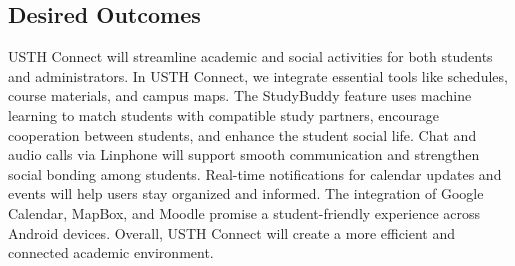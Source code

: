 \documentclass[12pt]{article}
\begin{document}
\subsection{Desired Outcomes}  
USTH Connect will streamline academic and social activities for both students and administrators.
In USTH Connect, we integrate essential tools like schedules, course materials, and campus maps.
The StudyBuddy feature uses machine learning to match students with compatible study partners, encourage cooperation between students, and enhance the student social life.
Chat and audio calls via Linphone will support smooth communication and strengthen social bonding among students.
Real-time notifications for calendar updates and events will help users stay organized and informed.
The integration of Google Calendar, MapBox, and Moodle promise a student-friendly experience across Android devices.
Overall, USTH Connect will create a more efficient and connected academic environment.
\end{document}
